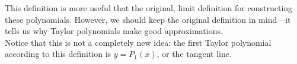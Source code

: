 
This definition is more useful that the original, limit definition for constructing these polynomials. However, we should keep the original definition in mind---it tells us why Taylor polynomials make good approximations. \\
Notice that this is not a completely new idea: the first Taylor polynomial according to this definition is \(y = P_1(x)\), or the tangent line.



\newpage
